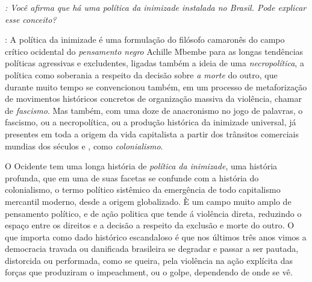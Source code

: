 \noindent\emph{: Você afirma que há uma política da inimizade instalada no Brasil. Pode
explicar esse conceito?}

\noindent{}: A política da inimizade é uma formulação do filósofo camaronês do campo
crítico ocidental do \emph{pensamento negro} Achille Mbembe para as
longas tendências políticas agressivas e excludentes, ligadas também a
ideia de uma \emph{necropolítica}, a política como soberania a respeito
da decisão sobre \emph{a morte} do outro, que durante muito tempo se
convencionou também, em um processo de metaforização de movimentos
históricos concretos de organização massiva da violência, chamar de
\emph{fascismo}. Mas também, com uma doze de anacronismo no jogo de
palavras, o fascismo, ou a necropolítica, ou a produção histórica da
inimizade universal, já presentes em toda a origem da vida capitalista a
partir dos trânsitos comerciais mundias dos séculos  e , como
\emph{colonialismo}.

O Ocidente tem uma longa história de \emph{política da inimizade}, uma
história profunda, que em uma de suas facetas se confunde com a história
do colonialismo, o termo político sistêmico da emergência de todo
capitalismo mercantil moderno, desde a origem globalizado. È um campo
muito amplo de pensamento político, e de ação politica que tende á
violência direta, reduzindo o espaço entre os direitos e a decisão a
respeito da exclusão e morte do outro. O que importa como dado histórico
escandaloso é que nos últimos três anos vimos a democracia travada ou
danificada brasileira se degradar e passar a ser pautada, distorcida ou
performada, como se queira, pela violência na ação explícita das forças
que produziram o impeachment, ou o golpe, dependendo de onde se vê.

